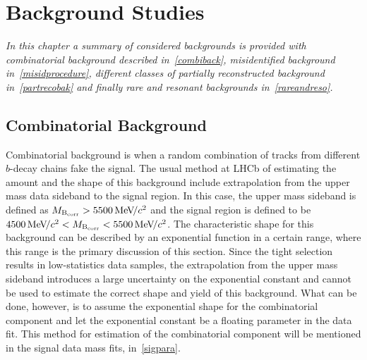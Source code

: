 \chapter{Background Studies}
\label{chap:back}


\textit{In this chapter a summary of considered backgrounds is provided with combinatorial background described in~\autoref{combiback}, misidentified background in~\autoref{misidprocedure}, different classes of partially reconstructed background in~\autoref{partrecobak} and finally rare and resonant backgrounds in~\autoref{rareandreso}.}

\section{Combinatorial Background}
\label{combiback}
Combinatorial background is when a random combination of tracks from different $b$-decay chains fake the signal. The usual method at \gls{LHCb} of estimating the amount and the shape of this background include extrapolation from the upper mass data sideband to the signal region. In this case, the upper mass sideband is defined as $M_{\rm{B_{corr}}} > 5500 {\mathrm{\,Me\kern -0.1em V\!/}c^2}$ and the signal region is defined to be $ 4500 {\mathrm{\,Me\kern -0.1em V\!/}c^2} <M_{\rm{B_{corr}}} < 5500 {\mathrm{\,Me\kern -0.1em V\!/}c^2}$. The characteristic shape for this background can be described by an exponential function in a certain range, where this range is the primary discussion of this section. Since the tight selection results in low-statistics data samples, the extrapolation from the upper mass sideband introduces a large uncertainty on the exponential constant and cannot be used to estimate the correct shape and yield of this background. What can be done, however, is to assume the exponential shape for the combinatorial component and let the exponential constant be a floating parameter in the data fit. This method for estimation of the combinatorial component will be mentioned in the signal data mass fits, in~\autoref{sigpara}. 

